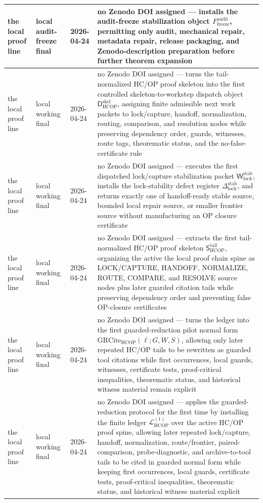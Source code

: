 \documentclass[12pt,a4paper]{article}
\begin{document}
{\begin{longtable}{|P{0.14\textwidth}|P{0.17\textwidth}|P{0.15\textwidth}|P{0.42\textwidth}|}
the local proof line & local audit-freeze final & 2026-04-24 & no Zenodo DOI assigned --- installs the audit-freeze stabilization object \(F_{\mathrm{freeze}}^{\mathrm{audit}}\), permitting only audit, mechanical repair, metadata repair, release packaging, and Zenodo-description preparation before further theorem expansion \\
\hline
the local proof line & local working final & 2026-04-24 & no Zenodo DOI assigned --- turns the tail-normalized HC/OP proof skeleton into the first controlled skeleton-to-workstep dispatch object \(\mathsf D_{\mathrm{HCOP}}^{\mathrm{skel}}\), assigning finite admissible next work packets to lock/capture, handoff, normalization, routing, comparison, and resolution nodes while preserving dependency order, guards, witnesses, route tags, theorematic status, and the no-false-certificate rule \\
the local proof line & local working final & 2026-04-24 & no Zenodo DOI assigned --- executes the first dispatched lock/capture stabilization packet \(\mathsf W_{\mathrm{lock}}^{\mathrm{stab}}\), installs the lock-stability defect register \(\Delta_{\mathrm{lock}}^{\mathrm{stab}}\), and returns exactly one of handoff-ready stable source, bounded local repair source, or smaller frontier source without manufacturing an OP closure certificate \\
\hline
the local proof line & local working final & 2026-04-24 & no Zenodo DOI assigned --- extracts the first tail-normalized HC/OP proof skeleton \(\mathsf S_{\mathrm{HCOP}}^{\mathrm{tail}}\), organizing the active the local proof chain spine as LOCK/CAPTURE, HANDOFF, NORMALIZE, ROUTE, COMPARE, and RESOLVE source nodes plus later guarded citation tails while preserving dependency order and preventing false OP-closure certificates \\
\hline
the local proof line & local working final & 2026-04-24 & no Zenodo DOI assigned --- turns the ledger into the first guarded-reduction pilot normal form \(\mathrm{GRCite}_{\mathrm{HCOP}}(\ell;G,W,S)\), allowing only later repeated HC/OP tails to be rewritten as guarded tool citations while first occurrences, local guards, witnesses, certificate tests, proof-critical inequalities, theorematic status, and historical witness material remain explicit \\
\hline
the local proof line & local working final & 2026-04-24 & no Zenodo DOI assigned --- applies the guarded-reduction protocol for the first time by installing the finite ledger \(\mathcal L_{\mathrm{HCOP}}^{(1)}\) over the active HC/OP proof spine, allowing later repeated lock/capture, handoff, normalization, route/frontier, paired-comparison, probe-diagnostic, and archive-to-tool tails to be cited in guarded normal form while keeping first occurrences, local guards, certificate tests, proof-critical inequalities, theorematic status, and historical witness material explicit \\

\end{longtable}}
\end{document}
